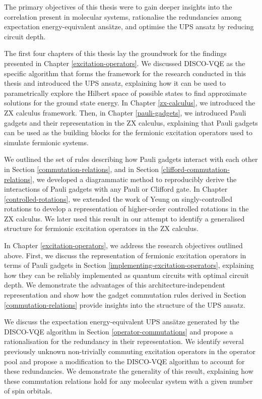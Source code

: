 
The primary objectives of this thesis were to gain deeper insights into the correlation present in molecular systems, rationalise the redundancies among expectation energy-equivalent ansätze, and optimise the UPS ansatz by reducing circuit depth.

The first four chapters of this thesis lay the groundwork for the findings presented in Chapter \ref{excitation-operators}. We discussed DISCO-VQE as the specific algorithm that forms the framework for the research conducted in this thesis and introduced the UPS ansatz, explaining how it can be used to parametrically explore the Hilbert space of possible states to find approximate solutions for the ground state energy. In Chapter \ref{zx-calculus}, we introduced the ZX calculus framework. Then, in Chapter \ref{pauli-gadgets}, we introduced Pauli gadgets and their representation in the ZX calculus, explaining that Pauli gadgets can be used as the building blocks for the fermionic excitation operators used to simulate fermionic systems.

We outlined the set of rules describing how Pauli gadgets interact with each other in Section \ref{commutation-relations}, and in Section \ref{clifford-commutation-relations}, we developed a diagrammatic method to reproducibly derive the interactions of Pauli gadgets with any Pauli or Clifford gate. In Chapter \ref{controlled-rotations}, we extended the work of Yeung \cite{Yeung2020} on singly-controlled rotations to develop a representation of higher-order controlled rotations in the ZX calculus. We later used this result in our attempt to identify a generalised structure for fermionic excitation operators in the ZX calculus.

In Chapter \ref{excitation-operators}, we address the research objectives outlined above. First, we discuss the representation of fermionic excitation operators in terms of Pauli gadgets in Section \ref{implementing-excitation-operators}, explaining how they can be reliably implemented as quantum circuits with optimal circuit depth. We demonstrate the advantages of this architecture-independent representation and show how the gadget commutation rules derived in Section \ref{commutation-relations} provide insights into the structure of the UPS ansatz.

We discuss the expectation energy-equivalent UPS ansätze generated by the DISCO-VQE algorithm in Section \ref{operator-commutations} and propose a rationalisation for the redundancy in their representation. We identify several previously unknown non-trivially commuting excitation operators in the operator pool and propose a modification to the DISCO-VQE algorithm to account for these redundancies. We demonstrate the generality of this result, explaining how these commutation relations hold for any molecular system with a given number of spin orbitals.

